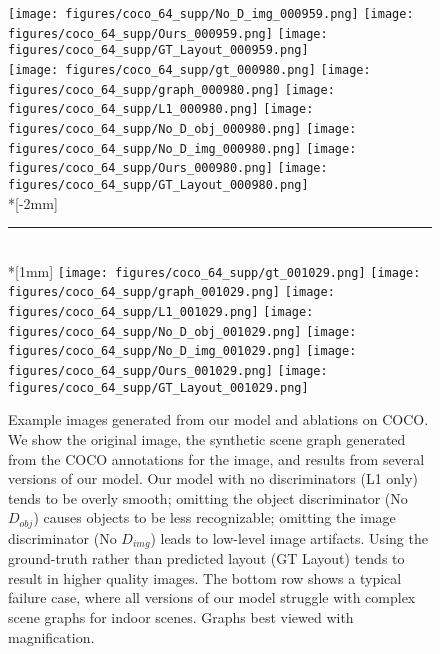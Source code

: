 \documentclass[10pt,twocolumn,letterpaper]{article}
\begin{document}
\begin{figure*}
  \texttt{[image: figures/coco\_64\_supp/No\_D\_img\_000959.png]}
  \texttt{[image: figures/coco\_64\_supp/Ours\_000959.png]}
  \texttt{[image: figures/coco\_64\_supp/GT\_Layout\_000959.png]} \\
  \texttt{[image: figures/coco\_64\_supp/gt\_000980.png]}
  \texttt{[image: figures/coco\_64\_supp/graph\_000980.png]}
  \texttt{[image: figures/coco\_64\_supp/L1\_000980.png]}
  \texttt{[image: figures/coco\_64\_supp/No\_D\_obj\_000980.png]}
  \texttt{[image: figures/coco\_64\_supp/No\_D\_img\_000980.png]}
  \texttt{[image: figures/coco\_64\_supp/Ours\_000980.png]}
  \texttt{[image: figures/coco\_64\_supp/GT\_Layout\_000980.png]} \\*[-2mm]
  \rule{\textwidth}{1pt} \\*[1mm]
  \texttt{[image: figures/coco\_64\_supp/gt\_001029.png]}
  \hspace*{1mm}\texttt{[image: figures/coco\_64\_supp/graph\_001029.png]}\hspace*{1mm}
  \texttt{[image: figures/coco\_64\_supp/L1\_001029.png]}
  \texttt{[image: figures/coco\_64\_supp/No\_D\_obj\_001029.png]}
  \texttt{[image: figures/coco\_64\_supp/No\_D\_img\_001029.png]}
  \texttt{[image: figures/coco\_64\_supp/Ours\_001029.png]}
  \texttt{[image: figures/coco\_64\_supp/GT\_Layout\_001029.png]} \\
  \caption{
    Example images generated from our model and ablations on COCO. We show the original image,
    the synthetic scene graph generated from the COCO annotations for the image, and results from
    several versions of our model. Our model with no discriminators (L1 only) tends to be overly smooth;
    omitting the object discriminator (No $D_{obj}$) causes objects to be less recognizable; omitting
    the image discriminator (No $D_{img}$) leads to low-level image artifacts. Using the ground-truth
    rather than predicted layout (GT Layout) tends to result in higher quality images. The bottom
    row shows a typical failure case, where all versions of our model struggle with complex scene
    graphs for indoor scenes. Graphs best viewed with magnification.
  }
  \label{fig:more-qual}
\end{figure*}
\end{document}
